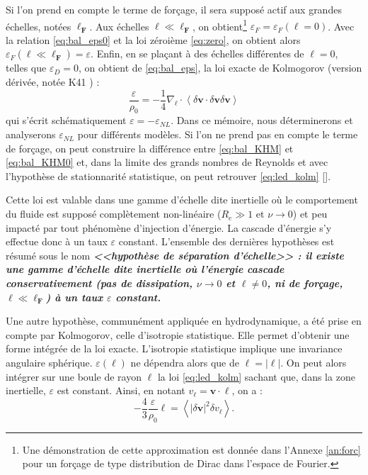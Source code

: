 Si l'on prend en compte le terme de forçage, il sera supposé actif aux grandes échelles, notées $\boldsymbol{\ell_F} $. Aux échelles $\boldsymbol{\ell} \ll \boldsymbol{\ell_F}$, on obtient\footnote{Une démonstration de cette approximation est donnée dans l'Annexe \ref{an:forc} pour un forçage de type distribution de Dirac dans l'espace de Fourier.} $\varepsilon_{F} = \varepsilon_{F}(\boldsymbol{\ell} =0)$.  Avec la relation \eqref{eq:bal_eps0} et la loi zéroième \eqref{eq:zero}, on obtient alors $\varepsilon_{F}(\boldsymbol{\ell} \ll \boldsymbol{\ell_F}) = \varepsilon$. Enfin, en se plaçant à des échelles différentes de $\boldsymbol{\ell} =0$, telles que $\varepsilon_{D}=0$, on obtient de \eqref{eq:bal_eps}, la loi exacte de Kolmogorov (version dérivée, notée \acs{K41} ) : 
\begin{equation}
 \label{eq:led_kolm} \frac{\varepsilon}{\rho_0} = - \frac{1}{4} \nabla_{\boldsymbol{\ell}} \cdot \left<\delta \boldsymbol{v} \cdot \delta \boldsymbol{v} \delta \boldsymbol{v}\right>
\end{equation}
qui s'écrit schématiquement $\varepsilon=-\varepsilon_{NL}$. Dans ce mémoire, nous déterminerons et analyserons $\varepsilon_{NL}$ pour différents modèles. Si l'on ne prend pas en compte le terme de forçage, on peut construire la différence entre \eqref{eq:bal_KHM} et \eqref{eq:bal_KHM0} et, dans la limite des grands nombres de Reynolds et avec l'hypothèse de stationnarité statistique, on peut retrouver \eqref{eq:led_kolm} [\cite{antonia_analogy_1997}]. 

Cette loi est valable dans une gamme d'échelle dite inertielle où le comportement du fluide est supposé complètement non-linéaire ($R_e \gg 1$ et $\nu \rightarrow 0$) et peu impacté par tout phénomène d'injection d'énergie. La cascade d'énergie s'y effectue donc à un taux $\varepsilon$ constant. L'ensemble des dernières hypothèses est résumé sous le nom \textbf{\emph{<<hypothèse de séparation d'échelle>> : 
il existe une gamme d'échelle dite inertielle où l'énergie cascade conservativement (pas de dissipation, $\nu \rightarrow 0$ et $\boldsymbol{\ell} \neq 0$, ni de forçage, $\boldsymbol{\ell} \ll \boldsymbol{\ell_F}$) à un taux $\varepsilon$ constant.}} 

Une autre hypothèse, communément appliquée en hydrodynamique, a été prise en compte par Kolmogorov, celle d'isotropie statistique. Elle permet d'obtenir une forme intégrée de la loi exacte. L'isotropie statistique implique une invariance angulaire sphérique. $\varepsilon(\boldsymbol{\ell})$ ne dépendra alors que de $\ell = |\boldsymbol{\ell}|$. On peut alors intégrer sur une boule de rayon $\ell$ la loi \eqref{eq:led_kolm} sachant que, dans la zone inertielle, $\varepsilon$ est constant. Ainsi, en notant $v_{\ell} = \boldsymbol{v} \cdot \boldsymbol{\ell}$, on a : 
\begin{equation}
  \label{eq:kolmogorov}  - \frac{4}{3} \frac{\varepsilon}{\rho_0} \ell = \left<|\delta \boldsymbol{v}|^2 \delta v_{\ell}\right>.
\end{equation}

